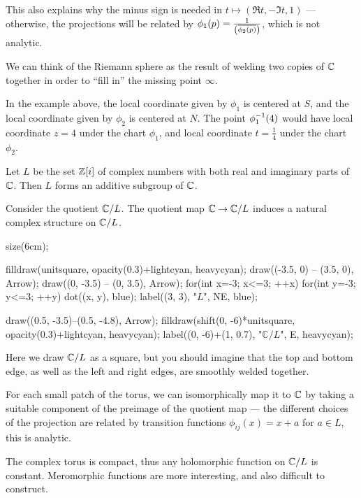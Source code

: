 \begin{example}
	This also explains why the minus sign is needed in $t \mapsto (\Re t, -\Im t, 1)$ ---
	otherwise, the projections will be related by
	$\phi_1(p) = \frac{1}{\left(\overline{\phi_2(p)}\right)}$, which is not analytic.

	We can think of the Riemann sphere as the result of welding two copies of $\mathbb C$ together in order
	to ``fill in'' the missing point $\infty$.
\end{example}

In the example above, the local coordinate given by $\phi_1$ is centered at $S$, and the local
coordinate given by $\phi_2$ is centered at $N$.
The point $\phi_1^{-1}(4)$ would have local coordinate $z = 4$ under the chart $\phi_1$, and
local coordinate $t = \frac{1}{4}$ under the chart $\phi_2$.

\begin{example}
	Let $L$ be the set $\mathbb Z[i]$ of complex numbers with both real and imaginary parts of $\mathbb C$.
	Then $L$ forms an additive subgroup of $\mathbb C$.

	Consider the quotient $\mathbb C/L$. The quotient map $\mathbb C \to \mathbb C/L$ induces a natural complex
	structure on $\mathbb C/L$.

	\begin{center}
		\begin{asy}
			size(6cm);

			filldraw(unitsquare, opacity(0.3)+lightcyan, heavycyan);
			draw((-3.5, 0) -- (3.5, 0), Arrow);
			draw((0, -3.5) -- (0, 3.5), Arrow);
			for(int x=-3; x<=3; ++x) for(int y=-3; y<=3; ++y) dot((x, y), blue);
			label((3, 3), "$L$", NE, blue);

			draw((0.5, -3.5)--(0.5, -4.8), Arrow);
			filldraw(shift(0, -6)*unitsquare, opacity(0.3)+lightcyan, heavycyan);
			label((0, -6)+(1, 0.7), "$\mathbb{C}/L$", E, heavycyan);
		\end{asy}
	\end{center}

	Here we draw $\mathbb C/L$ as a square, but you should imagine that the top and bottom edge, as well
	as the left and right edges, are smoothly welded together.

	For each small patch of the torus, we can isomorphically map it to $\mathbb C$ by taking a suitable
	component of the preimage of the quotient map --- the different choices of the projection are
	related by transition functions $\phi_{ij}(x) = x + a$ for $a \in L$, this is analytic.

	The complex torus is compact, thus any holomorphic function on $\mathbb C/L$ is constant. Meromorphic
	functions are more interesting, and also difficult to construct.
\end{example}

